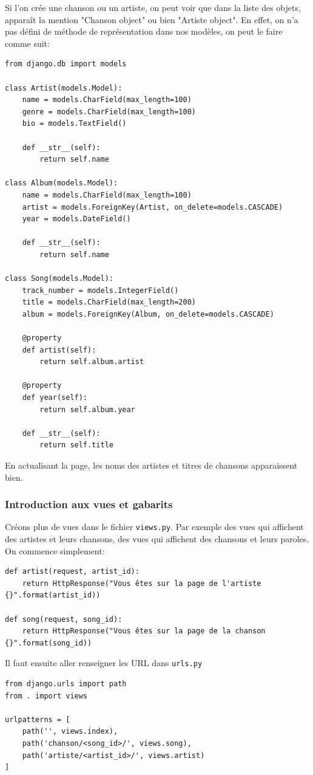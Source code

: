 \documentclass[a4paper, 10pt]{article}
\begin{document}
Si l'on crée une chanson ou un artiste, on peut voir que dans la liste des objets, apparaît la mention "Chanson object" ou bien "Artiste object". En effet, on n'a pas défini de méthode de représentation dans nos modèles, on peut le faire comme suit:
\begin{verbatim}
from django.db import models

class Artist(models.Model):
    name = models.CharField(max_length=100)
    genre = models.CharField(max_length=100)
    bio = models.TextField()

    def __str__(self):
        return self.name

class Album(models.Model):
    name = models.CharField(max_length=100)
    artist = models.ForeignKey(Artist, on_delete=models.CASCADE)
    year = models.DateField()

    def __str__(self):
        return self.name

class Song(models.Model):
    track_number = models.IntegerField()
    title = models.CharField(max_length=200)
    album = models.ForeignKey(Album, on_delete=models.CASCADE)

    @property
    def artist(self):
        return self.album.artist

    @property
    def year(self):
        return self.album.year

    def __str__(self):
        return self.title
\end{verbatim}

En actualisant la page, les noms des artistes et titres de chansons apparaissent bien.

\subsubsection{Introduction aux vues et gabarits}
Créons plus de vues dans le fichier \texttt{views.py}. Par exemple des vues qui affichent des artistes et leurs chansons, des vues qui affichent des chansons et leurs paroles. On commence simplement:

\begin{verbatim}
def artist(request, artist_id):
    return HttpResponse("Vous êtes sur la page de l'artiste {}".format(artist_id))

def song(request, song_id):
    return HttpResponse("Vous êtes sur la page de la chanson {}".format(song_id))
\end{verbatim}

Il faut ensuite aller renseigner les URL dans \texttt{urls.py}
\begin{verbatim}
from django.urls import path
from . import views

urlpatterns = [
    path('', views.index),
    path('chanson/<song_id>/', views.song),
    path('artiste/<artist_id>/', views.artist)
]
\end{verbatim}
\end{document}
